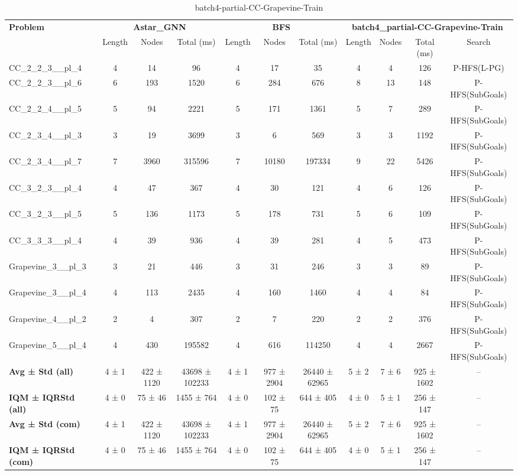 \begin{table}[!ht]
\centering
\scriptsize
\begin{tabular}{l|ccc|ccc|cccc}
\multirow{2}{*}{\textbf{Problem}} & \multicolumn{3}{c|}{\textbf{Astar\_GNN}} & \multicolumn{3}{c|}{\textbf{BFS}} & \multicolumn{4}{c}{\textbf{batch4\_partial-CC-Grapevine-Train}} \\
\cline{2-11}
& Length & Nodes & Total (ms) & Length & Nodes & Total (ms) & Length & Nodes & Total (ms) & Search \\
\hline
CC\_2\_2\_3\_\_pl\_4 & 4 & 14 & 96 & 4 & 17 & 35 & 4 & 4 & 126 & P-HFS(L-PG) \\
CC\_2\_2\_3\_\_pl\_6 & 6 & 193 & 1520 & 6 & 284 & 676 & 8 & 13 & 148 & P-HFS(SubGoals) \\
CC\_2\_2\_4\_\_pl\_5 & 5 & 94 & 2221 & 5 & 171 & 1361 & 5 & 7 & 289 & P-HFS(SubGoals) \\
CC\_2\_3\_4\_\_pl\_3 & 3 & 19 & 3699 & 3 & 6 & 569 & 3 & 3 & 1192 & P-HFS(SubGoals) \\
CC\_2\_3\_4\_\_pl\_7 & 7 & 3960 & 315596 & 7 & 10180 & 197334 & 9 & 22 & 5426 & P-HFS(SubGoals) \\
CC\_3\_2\_3\_\_pl\_4 & 4 & 47 & 367 & 4 & 30 & 121 & 4 & 6 & 126 & P-HFS(SubGoals) \\
CC\_3\_2\_3\_\_pl\_5 & 5 & 136 & 1173 & 5 & 178 & 731 & 5 & 6 & 109 & P-HFS(SubGoals) \\
CC\_3\_3\_3\_\_pl\_4 & 4 & 39 & 936 & 4 & 39 & 281 & 4 & 5 & 473 & P-HFS(SubGoals) \\
Grapevine\_3\_\_pl\_3 & 3 & 21 & 446 & 3 & 31 & 246 & 3 & 3 & 89 & P-HFS(SubGoals) \\
Grapevine\_3\_\_pl\_4 & 4 & 113 & 2435 & 4 & 160 & 1460 & 4 & 4 & 84 & P-HFS(SubGoals) \\
Grapevine\_4\_\_pl\_2 & 2 & 4 & 307 & 2 & 7 & 220 & 2 & 2 & 376 & P-HFS(SubGoals) \\
Grapevine\_5\_\_pl\_4 & 4 & 430 & 195582 & 4 & 616 & 114250 & 4 & 4 & 2667 & P-HFS(SubGoals) \\
\hline
\textbf{Avg ± Std (all)} & 4 ± 1 & 422 ± 1120 & 43698 ± 102233 & 4 ± 1 & 977 ± 2904 & 26440 ± 62965 & 5 ± 2 & 7 ± 6 & 925 ± 1602 & -- \\
\textbf{IQM ± IQRStd (all)} & 4 ± 0 & 75 ± 46 & 1455 ± 764 & 4 ± 0 & 102 ± 75 & 644 ± 405 & 4 ± 0 & 5 ± 1 & 256 ± 147 & -- \\
\textbf{Avg ± Std (com)} & 4 ± 1 & 422 ± 1120 & 43698 ± 102233 & 4 ± 1 & 977 ± 2904 & 26440 ± 62965 & 5 ± 2 & 7 ± 6 & 925 ± 1602 & -- \\
\textbf{IQM ± IQRStd (com)} & 4 ± 0 & 75 ± 46 & 1455 ± 764 & 4 ± 0 & 102 ± 75 & 644 ± 405 & 4 ± 0 & 5 ± 1 & 256 ± 147 & -- \\
\end{tabular}
\caption{batch4-partial-CC-Grapevine-Train}
\label{tab:batch4_partial_CC-Grapevine_comparison_train}
\end{table}
